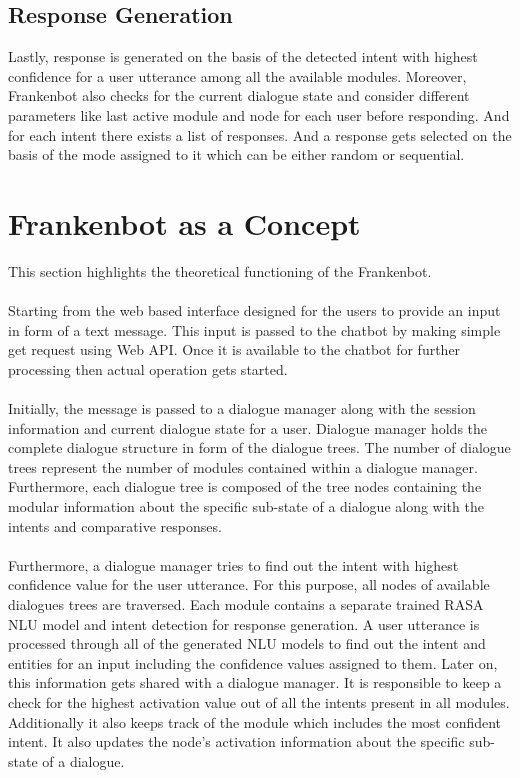 \subsection{Response Generation}
Lastly, response is generated on the basis of the detected intent with highest confidence for a user utterance among all the available modules. Moreover, Frankenbot also checks for the current dialogue state and consider different parameters like last active module and node for each user before responding. And for each intent there exists a list of responses. And a response gets selected on the basis of the mode assigned to it which can be either random or sequential.  

\section{Frankenbot as a Concept}
This section highlights the theoretical functioning of the Frankenbot.
\\~\\
Starting from the web based interface designed for the users to provide an input in form of a text message. This input is passed to the chatbot by making simple get request using Web API. Once it is available to the chatbot for further processing then actual operation gets started.
\\~\\
Initially, the message is passed to a dialogue manager along with the session information and current dialogue state for a user. Dialogue manager holds the complete dialogue structure in form of the dialogue trees. The number of dialogue trees represent the number of modules contained within a dialogue manager. Furthermore, each dialogue tree is composed of the tree nodes containing the modular information about the specific sub-state of a dialogue along with the intents and comparative responses.
\\~\\
Furthermore, a dialogue manager tries to find out the intent with highest confidence value for the user utterance. For this purpose, all nodes of available dialogues trees are traversed. Each module contains a separate trained RASA NLU model and intent detection for response generation. A user utterance is processed through all of the generated NLU models to find out the intent and entities for an input including the confidence values assigned to them. Later on, this information gets shared with a dialogue manager. It is responsible to keep a check for the highest activation value out of all the intents present in all modules. Additionally it also keeps track of the module which includes the most confident intent. It also updates the node's activation information about the specific sub-state of a dialogue.
